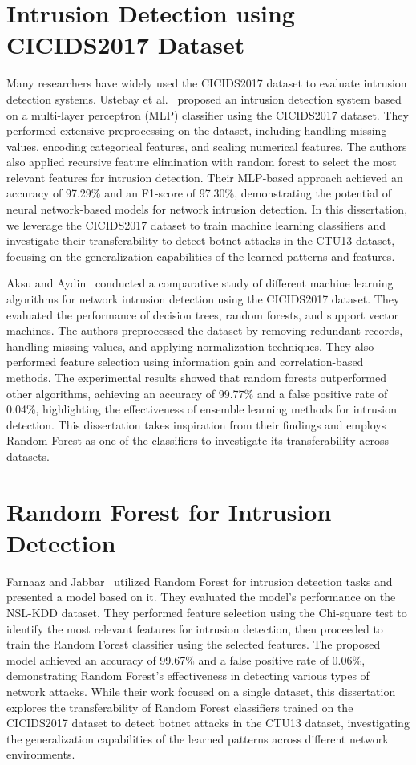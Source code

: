 \section{Intrusion Detection using CICIDS2017 Dataset}

Many researchers have widely used the CICIDS2017 dataset to evaluate intrusion detection systems. Ustebay et al.~\cite{ustebay2018intrusion} proposed an intrusion detection system based on a multi-layer perceptron (MLP) classifier using the CICIDS2017 dataset. They performed extensive preprocessing on the dataset, including handling missing values, encoding categorical features, and scaling numerical features. The authors also applied recursive feature elimination with random forest to select the most relevant features for intrusion detection. Their MLP-based approach achieved an accuracy of 97.29\% and an F1-score of 97.30\%, demonstrating the potential of neural network-based models for network intrusion detection. In this dissertation, we leverage the CICIDS2017 dataset to train machine learning classifiers and investigate their transferability to detect botnet attacks in the CTU13 dataset, focusing on the generalization capabilities of the learned patterns and features.

Aksu and Aydin~\cite{aksu2018detecting} conducted a comparative study of different machine learning algorithms for network intrusion detection using the CICIDS2017 dataset. They evaluated the performance of decision trees, random forests, and support vector machines. The authors preprocessed the dataset by removing redundant records, handling missing values, and applying normalization techniques. They also performed feature selection using information gain and correlation-based methods. The experimental results showed that random forests outperformed other algorithms, achieving an accuracy of 99.77\% and a false positive rate of 0.04\%, highlighting the effectiveness of ensemble learning methods for intrusion detection. This dissertation takes inspiration from their findings and employs Random Forest as one of the classifiers to investigate its transferability across datasets.

\section{Random Forest for Intrusion Detection}

Farnaaz and Jabbar~\cite{farnaaz2016random} utilized Random Forest for intrusion detection tasks and presented a model based on it. They evaluated the model's performance on the NSL-KDD dataset. They performed feature selection using the Chi-square test to identify the most relevant features for intrusion detection, then proceeded to train the Random Forest classifier using the selected features. The proposed model achieved an accuracy of 99.67\% and a false positive rate of 0.06\%, demonstrating Random Forest's effectiveness in detecting various types of network attacks. While their work focused on a single dataset, this dissertation explores the transferability of Random Forest classifiers trained on the CICIDS2017 dataset to detect botnet attacks in the CTU13 dataset, investigating the generalization capabilities of the learned patterns across different network environments.

